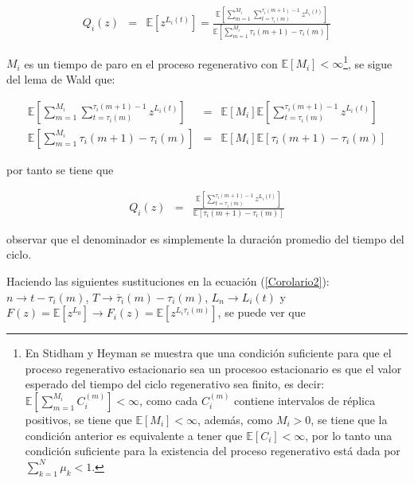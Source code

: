 \documentclass{article}
\newcommand{\esp}{\mathbb{E}}
\begin{document}
\begin{eqnarray*}
Q_{i}\left(z\right)&=&\esp\left[z^{L_{i}\left(t\right)}\right]=\frac{\esp\left[\sum_{m=1}^{M_{i}}\sum_{t=\tau_{i}\left(m\right)}^{\tau_{i}\left(m+1\right)-1}z^{L_{i}\left(t\right)}\right]}{\esp\left[\sum_{m=1}^{M_{i}}\tau_{i}\left(m+1\right)-\tau_{i}\left(m\right)\right]}
\end{eqnarray*}

$M_{i}$ es un tiempo de paro en el proceso regenerativo con $\esp\left[M_{i}\right]<\infty$\footnote{En Stidham\cite{Stidham} y Heyman  se muestra que una condici\'on suficiente para que el proceso regenerativo 
estacionario sea un procesoo estacionario es que el valor esperado del tiempo del ciclo regenerativo sea finito, es decir: $\esp\left[\sum_{m=1}^{M_{i}}C_{i}^{(m)}\right]<\infty$, como cada $C_{i}^{(m)}$ contiene intervalos de r\'eplica positivos, se tiene que $\esp\left[M_{i}\right]<\infty$, adem\'as, como $M_{i}>0$, se tiene que la condici\'on anterior es equivalente a tener que $\esp\left[C_{i}\right]<\infty$,
por lo tanto una condici\'on suficiente para la existencia del proceso regenerativo est\'a dada por $\sum_{k=1}^{N}\mu_{k}<1.$}, se sigue del lema de Wald que:


\begin{eqnarray*}
\esp\left[\sum_{m=1}^{M_{i}}\sum_{t=\tau_{i}\left(m\right)}^{\tau_{i}\left(m+1\right)-1}z^{L_{i}\left(t\right)}\right]&=&\esp\left[M_{i}\right]\esp\left[\sum_{t=\tau_{i}\left(m\right)}^{\tau_{i}\left(m+1\right)-1}z^{L_{i}\left(t\right)}\right]\\
\esp\left[\sum_{m=1}^{M_{i}}\tau_{i}\left(m+1\right)-\tau_{i}\left(m\right)\right]&=&\esp\left[M_{i}\right]\esp\left[\tau_{i}\left(m+1\right)-\tau_{i}\left(m\right)\right]
\end{eqnarray*}

por tanto se tiene que


\begin{eqnarray*}
Q_{i}\left(z\right)&=&\frac{\esp\left[\sum_{t=\tau_{i}\left(m\right)}^{\tau_{i}\left(m+1\right)-1}z^{L_{i}\left(t\right)}\right]}{\esp\left[\tau_{i}\left(m+1\right)-\tau_{i}\left(m\right)\right]}
\end{eqnarray*}

observar que el denominador es simplemente la duraci\'on promedio del tiempo del ciclo.


Haciendo las siguientes sustituciones en la ecuaci\'on (\ref{Corolario2}): $n\rightarrow t-\tau_{i}\left(m\right)$, $T \rightarrow \overline{\tau}_{i}\left(m\right)-\tau_{i}\left(m\right)$, $L_{n}\rightarrow L_{i}\left(t\right)$ y $F\left(z\right)=\esp\left[z^{L_{0}}\right]\rightarrow F_{i}\left(z\right)=\esp\left[z^{L_{i}\tau_{i}\left(m\right)}\right]$, se puede ver que
\end{document}
